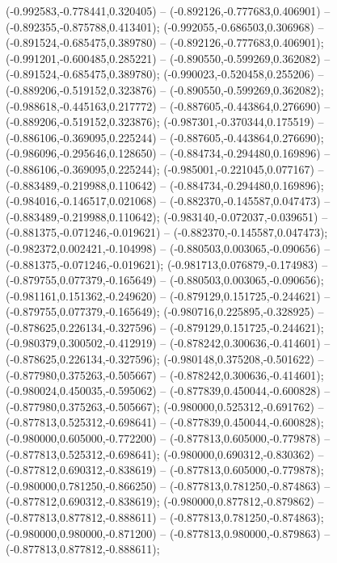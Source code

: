  (-0.992583,-0.778441,0.320405) -- (-0.892126,-0.777683,0.406901) -- (-0.892355,-0.875788,0.413401);
 (-0.992055,-0.686503,0.306968) -- (-0.891524,-0.685475,0.389780) -- (-0.892126,-0.777683,0.406901);
 (-0.991201,-0.600485,0.285221) -- (-0.890550,-0.599269,0.362082) -- (-0.891524,-0.685475,0.389780);
 (-0.990023,-0.520458,0.255206) -- (-0.889206,-0.519152,0.323876) -- (-0.890550,-0.599269,0.362082);
 (-0.988618,-0.445163,0.217772) -- (-0.887605,-0.443864,0.276690) -- (-0.889206,-0.519152,0.323876);
 (-0.987301,-0.370344,0.175519) -- (-0.886106,-0.369095,0.225244) -- (-0.887605,-0.443864,0.276690);
 (-0.986096,-0.295646,0.128650) -- (-0.884734,-0.294480,0.169896) -- (-0.886106,-0.369095,0.225244);
 (-0.985001,-0.221045,0.077167) -- (-0.883489,-0.219988,0.110642) -- (-0.884734,-0.294480,0.169896);
 (-0.984016,-0.146517,0.021068) -- (-0.882370,-0.145587,0.047473) -- (-0.883489,-0.219988,0.110642);
 (-0.983140,-0.072037,-0.039651) -- (-0.881375,-0.071246,-0.019621) -- (-0.882370,-0.145587,0.047473);
 (-0.982372,0.002421,-0.104998) -- (-0.880503,0.003065,-0.090656) -- (-0.881375,-0.071246,-0.019621);
 (-0.981713,0.076879,-0.174983) -- (-0.879755,0.077379,-0.165649) -- (-0.880503,0.003065,-0.090656);
 (-0.981161,0.151362,-0.249620) -- (-0.879129,0.151725,-0.244621) -- (-0.879755,0.077379,-0.165649);
 (-0.980716,0.225895,-0.328925) -- (-0.878625,0.226134,-0.327596) -- (-0.879129,0.151725,-0.244621);
 (-0.980379,0.300502,-0.412919) -- (-0.878242,0.300636,-0.414601) -- (-0.878625,0.226134,-0.327596);
 (-0.980148,0.375208,-0.501622) -- (-0.877980,0.375263,-0.505667) -- (-0.878242,0.300636,-0.414601);
 (-0.980024,0.450035,-0.595062) -- (-0.877839,0.450044,-0.600828) -- (-0.877980,0.375263,-0.505667);
 (-0.980000,0.525312,-0.691762) -- (-0.877813,0.525312,-0.698641) -- (-0.877839,0.450044,-0.600828);
 (-0.980000,0.605000,-0.772200) -- (-0.877813,0.605000,-0.779878) -- (-0.877813,0.525312,-0.698641);
 (-0.980000,0.690312,-0.830362) -- (-0.877812,0.690312,-0.838619) -- (-0.877813,0.605000,-0.779878);
 (-0.980000,0.781250,-0.866250) -- (-0.877813,0.781250,-0.874863) -- (-0.877812,0.690312,-0.838619);
 (-0.980000,0.877812,-0.879862) -- (-0.877813,0.877812,-0.888611) -- (-0.877813,0.781250,-0.874863);
 (-0.980000,0.980000,-0.871200) -- (-0.877813,0.980000,-0.879863) -- (-0.877813,0.877812,-0.888611);
